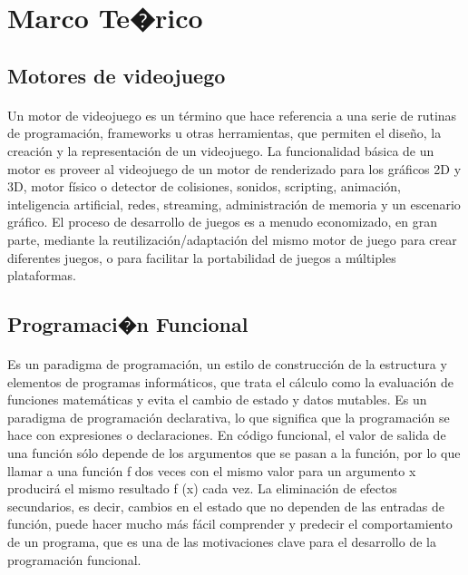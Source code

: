 \documentclass{standalone}
\begin{document}
\section{Marco Te�rico}

\subsection{Motores de videojuego}

\paragraph{}
Un motor de videojuego es un término que hace referencia a una serie de rutinas de programación, frameworks u otras herramientas, que permiten el diseño, la creación y la representación de un videojuego. La funcionalidad básica de un motor es proveer al videojuego de un motor de renderizado para los gráficos 2D y 3D, motor físico o detector de colisiones, sonidos, scripting, animación, inteligencia artificial, redes, streaming, administración de memoria y un escenario gráfico. El proceso de desarrollo de juegos es a menudo economizado, en gran parte, mediante la reutilización/adaptación del mismo motor de juego para crear diferentes juegos, o para facilitar la portabilidad de juegos a múltiples plataformas.


\subsection{Programaci�n Funcional}

\paragraph{}
Es un paradigma de programación, un estilo de construcción de la estructura y elementos de programas informáticos, que trata el cálculo como la evaluación de funciones matemáticas y evita el cambio de estado y datos mutables. Es un paradigma de programación declarativa, lo que significa que la programación se hace con expresiones o declaraciones. En código funcional, el valor de salida de una función sólo depende de los argumentos que se pasan a la función, por lo que llamar a una función f dos veces con el mismo valor para un argumento x producirá el mismo resultado f (x) cada vez. La eliminación de efectos secundarios, es decir, cambios en el estado que no dependen de las entradas de función, puede hacer mucho más fácil comprender y predecir el comportamiento de un programa, que es una de las motivaciones clave para el desarrollo de la programación funcional.
\end{document}
